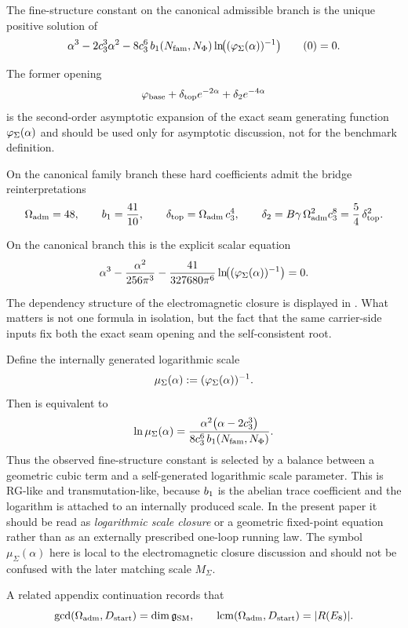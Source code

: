 \begin{theorem}
\label{thm:exact-electromagnetic-closure}
The fine-structure constant on the canonical admissible branch is the unique positive solution of
\label{eq:carrier-cfe}
\[
\alpha^3
-2c_3^3\alpha^2
-8c_3^6\,b_1(N_{\mathrm{fam}},N_\Phi)
\ln\!\bigl((\varphi_{\Sigma}(\alpha))^{-1}\bigr)\tag{\theequation}
=0.
\]
\end{theorem}

\begin{corollary}
The former opening
\[
\varphi_{\mathrm{base}}+\delta_{\mathrm{top}} e^{-2\alpha}+\delta_2e^{-4\alpha}
\]
is the second-order asymptotic expansion of the exact seam generating function
$\varphi_{\Sigma}(\alpha)$ and should be used only for asymptotic discussion, not for the benchmark definition.
\end{corollary}

On the canonical family branch these hard coefficients admit the bridge reinterpretations
\[
\Omega_{\mathrm{adm}}=48,
\qquad
b_1=\frac{41}{10},
\qquad
\delta_{\mathrm{top}}=\Omega_{\mathrm{adm}}\,c_3^4,
\qquad
\delta_2=B\gamma\,\Omega_{\mathrm{adm}}^2c_3^8=\frac54\,\delta_{\mathrm{top}}^2.
\]

On the canonical branch this is the explicit scalar equation
\[
\alpha^3-\frac{\alpha^2}{256\pi^3}-\frac{41}{327680\pi^6}\ln\!\bigl((\varphi_{\Sigma}(\alpha))^{-1}\bigr)=0.
\]

The dependency structure of the electromagnetic closure is displayed in . What matters is not one formula in isolation, but the fact that the same carrier-side inputs fix both the exact seam opening and the self-consistent root.
\begin{remark}
Define the internally generated logarithmic scale
\[
\mu_\Sigma(\alpha):=(\varphi_{\Sigma}(\alpha))^{-1}.
\]
Then  is equivalent to
\[
\ln \mu_\Sigma(\alpha)
=
\frac{\alpha^2\bigl(\alpha-2c_3^3\bigr)}
{8c_3^6\,b_1(N_{\mathrm{fam}},N_\Phi)}.
\]
Thus the observed fine-structure constant is selected by a balance between a geometric cubic term
and a self-generated logarithmic scale parameter. This is RG-like and transmutation-like,
because $b_1$ is the abelian trace coefficient and the logarithm is attached to an internally
produced scale. In the present paper it should be read as \emph{logarithmic scale closure} or a
geometric fixed-point equation rather than as an externally prescribed one-loop running law. The
symbol $\mu_\Sigma(\alpha)$ here is local to the electromagnetic closure discussion and should
not be confused with the later matching scale $M_\Sigma$.
\end{remark}
A related appendix continuation records that
\[
\gcd(\Omega_{\mathrm{adm}},D_{\mathrm{start}})=\dim \mathfrak g_{\mathrm{SM}},
\qquad
\operatorname{lcm}(\Omega_{\mathrm{adm}},D_{\mathrm{start}})=|R(E_8)|.
\]

